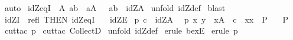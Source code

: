 \begin{isabellebody}
%
\isadelimproof
%
\endisadelimproof
%
\isatagproof
{}\isamarkupfalse%
\ auto\isanewline
{}\isamarkupfalse%
%
\endisatagproof
{\isafoldproof}%
%
\isadelimproof
\isanewline
%
\endisadelimproof
\isanewline
\isanewline
\isanewline
\isanewline
{}\isamarkupfalse%
\ idZ{\isacharunderscore}eqI{\isacharcolon}\ {\isachardoublequoteopen}{\isacharbang}{\isacharbang}\ A{\isachardot}{\isacharbrackleft}{\isacharbar}\ a{\isacharequal}b{\isacharsemicolon}\ \ a{\isacharcolon}A\ {\isacharbar}{\isacharbrackright}\ {\isacharequal}{\isacharequal}{\isachargreater}\ {\isacharparenleft}a{\isacharcomma}b{\isacharparenright}\ {\isacharcolon}\ idZ{\isacharparenleft}A{\isacharparenright}{\isachardoublequoteclose}\isanewline
%
\isadelimproof
%
\endisadelimproof
%
\isatagproof
{}\isamarkupfalse%
\ {\isacharparenleft}unfold\ idZ{\isacharunderscore}def{\isacharparenright}\isanewline
{}\isamarkupfalse%
\ blast\isanewline
{}\isamarkupfalse%
%
\endisatagproof
{\isafoldproof}%
%
\isadelimproof
\isanewline
%
\endisadelimproof
\isanewline
{}\isamarkupfalse%
\ idZI\ {\isacharequal}\ refl\ {\isacharbrackleft}THEN\ idZ{\isacharunderscore}eqI{\isacharbrackright}\ \ \isanewline
\isanewline
\isanewline
{}\isamarkupfalse%
\ idZE{\isacharcolon}\isanewline
{}\ p{}{\isacharcolon}\ {\isachardoublequoteopen}c\ {\isacharcolon}\ idZ{\isacharparenleft}A{\isacharparenright}\ {\isachardoublequoteclose}\isanewline
{}\ p{}{\isacharcolon}\ {\isachardoublequoteopen}{\isacharbang}{\isacharbang}x\ y{\isachardot}\ {\isasymlbrakk}\ x{\isacharcolon}A{\isacharsemicolon}\ \ c\ {\isacharequal}\ {\isacharparenleft}x{\isacharcomma}x{\isacharparenright}{\isasymrbrakk}\ {\isasymLongrightarrow}\ P{\isachardoublequoteclose}\ \ \isanewline
{}\ {\isachardoublequoteopen}P{\isachardoublequoteclose}\isanewline
%
\isadelimproof
%
\endisadelimproof
%
\isatagproof
{}\isamarkupfalse%
\ {\isacharparenleft}cut{\isacharunderscore}tac\ p{}{\isacharparenright}\isanewline
{}\isamarkupfalse%
\ {\isacharparenleft}cut{\isacharunderscore}tac\ CollectD{\isacharparenright}\isanewline
{}\isamarkupfalse%
\ {\isacharparenleft}unfold\ idZ{\isacharunderscore}def{\isacharparenright}\isanewline
{}\isamarkupfalse%
\ {\isacharparenleft}erule\ bexE{\isacharparenright}\isanewline
{}\isamarkupfalse%
\ {\isacharparenleft}erule\ p{}{\isacharparenright}\isanewline

\end{isabellebody}
